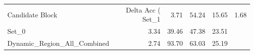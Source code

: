 \begin{tabular}{lrrrr}
\toprule
Candidate Block & Delta Acc (%
\midrule
Set_1 & 3.71 & 54.24 & 15.65 & 1.68 \\
Set_0 & 3.34 & 39.46 & 47.38 & 23.51 \\
Dynamic_Region_All_Combined & 2.74 & 93.70 & 63.03 & 25.19 \\
\bottomrule
\end{tabular}

